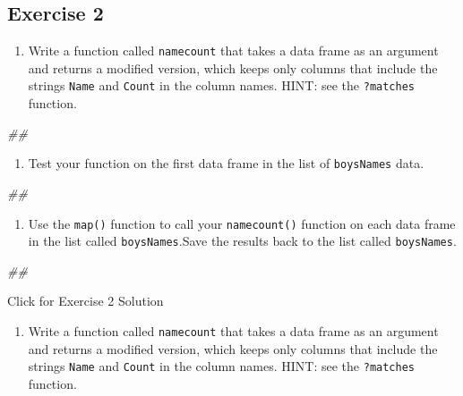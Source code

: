 \documentclass[
]{book}
\newenvironment{Shaded}{\begin{snugshade}}{\end{snugshade}}
\newcommand{\CommentTok}[1]{\textcolor[rgb]{0.56,0.35,0.01}{\textit{#1}}}
\providecommand{\tightlist}{%
  \setlength{\itemsep}{0pt}\setlength{\parskip}{0pt}}
\begin{document}
\hypertarget{exercise-2-2}{%
\subsection{Exercise 2}\label{exercise-2-2}}

\begin{enumerate}
\def\labelenumi{\arabic{enumi}.}
\tightlist
\item
  Write a function called \texttt{namecount} that takes a data frame as an argument and returns a modified version, which keeps only columns that include the strings \texttt{Name} and \texttt{Count} in the column names. HINT: see the \texttt{?matches} function.
\end{enumerate}

\begin{Shaded}
\begin{Highlighting}[]
\CommentTok{\#\# }
\end{Highlighting}
\end{Shaded}

\begin{enumerate}
\def\labelenumi{\arabic{enumi}.}
\setcounter{enumi}{1}
\tightlist
\item
  Test your function on the first data frame in the list of \texttt{boysNames} data.
\end{enumerate}

\begin{Shaded}
\begin{Highlighting}[]
\CommentTok{\#\# }
\end{Highlighting}
\end{Shaded}

\begin{enumerate}
\def\labelenumi{\arabic{enumi}.}
\setcounter{enumi}{2}
\tightlist
\item
  Use the \texttt{map()} function to call your \texttt{namecount()} function on each data frame in the list called \texttt{boysNames}.Save the results back to the list called \texttt{boysNames}.
\end{enumerate}

\begin{Shaded}
\begin{Highlighting}[]
\CommentTok{\#\# }
\end{Highlighting}
\end{Shaded}

{Click for Exercise 2 Solution}

\begin{enumerate}
\def\labelenumi{\arabic{enumi}.}
\tightlist
\item
  Write a function called \texttt{namecount} that takes a data frame as an argument and returns a modified version, which keeps only columns that include the strings \texttt{Name} and \texttt{Count} in the column names. HINT: see the \texttt{?matches} function.
\end{enumerate}
\end{document}

